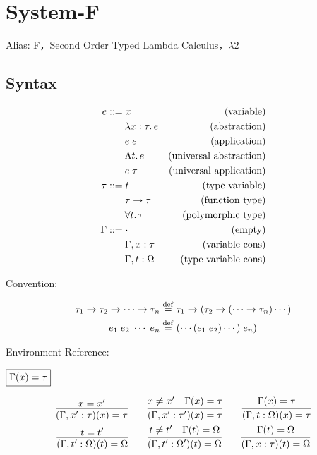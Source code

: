 \section{System-F}

Alias: F，Second Order Typed Lambda Calculus，$\lambda 2$ \cite{Girard:1989}

\subsection{Syntax}

\begin{align*}
  e
  &\BNFassign x &(\text{variable}) \\
  &\BNFor \lambda x: \tau\ldotp e &(\text{abstraction}) \\
  &\BNFor e\; e &(\text{application}) \\
  &\BNFor \Lambda t\ldotp e &(\text{universal abstraction}) \\
  &\BNFor e\; \tau &(\text{universal application}) \\
  \tau
  &\BNFassign t &(\text{type variable}) \\
  &\BNFor \tau \to \tau &(\text{function type}) \\
  &\BNFor \forall t\ldotp \tau &(\text{polymorphic type}) \\
  \Gamma
  &\BNFassign \cdot &(\text{empty}) \\
  &\BNFor \Gamma, x: \tau &(\text{variable cons}) \\
  &\BNFor \Gamma, t: \Omega &(\text{type variable cons})
\end{align*}

Convention:

\begin{align*}
  \tau_1 \to \tau_2 \to \cdots \to \tau_n &\mathrel{\overset{\mathrm{def}}{=}} \tau_1 \to (\tau_2 \to (\cdots \to \tau_n) \cdots ) \\
  e_1\; e_2\; \cdots \; e_n &\mathrel{\overset{\mathrm{def}}{=}} (\cdots(e_1\; e_2)\cdots)\; e_n)
\end{align*}

Environment Reference:

$\fbox{$\Gamma(x) = \tau$}$

\begin{gather*}
  \infer{(\Gamma, x': \tau)(x) = \tau}{
    x = x'
  }
  \hspace{2em}
  \infer{(\Gamma, x': \tau')(x) = \tau}{
    x \neq x'
    &
    \Gamma(x) = \tau
  }
  \hspace{2em}
  \infer{(\Gamma, t: \Omega)(x) = \tau}{
    \Gamma(x) = \tau
  }
  \\
  \infer{(\Gamma, t': \Omega)(t) = \Omega}{
    t = t'
  }
  \hspace{2em}
  \infer{(\Gamma, t': \Omega')(t) = \Omega}{
    t \neq t'
    &
    \Gamma(t) = \Omega
  }
  \hspace{2em}
  \infer{(\Gamma, x: \tau)(t) = \Omega}{
    \Gamma(t) = \Omega
  }
\end{gather*}

